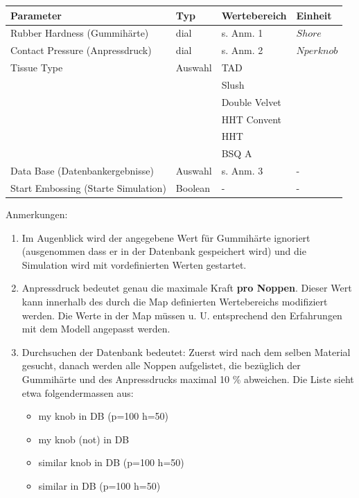 \vspace{0.5cm}
\begin{tabular}{|l|l|l|l|} \hline
Parameter 		& Typ 		& Wertebereich 	& Einheit	         \\ \hline
Rubber Hardness (Gummih\"arte) 	& dial		& s. Anm. 1 	& \symbol{23} $Shore$ \\ \hline
Contact Pressure (Anpressdruck)	& dial		& s. Anm. 2 	& $N per knob$ 	 \\ \hline
Tissue Type      	& Auswahl 	& TAD		&		 \\ 
			& 		& Slush 	&		 \\
			& 		& Double Velvet &		 \\				
			& 		& HHT Convent	& 		 \\ 
			&		& HHT      	& 		 \\ 
			& 		& BSQ A 	& 		 \\ \hline
Data Base (Datenbankergebnisse)		& Auswahl	& s. Anm. 3	& - 		 \\ \hline
Start Embossing (Starte Simulation)    	& Boolean   	& -             & -              \\ \hline
\end{tabular}
\vspace{0.5cm}


Anmerkungen: 
\begin{enumerate}

\item Im Augenblick wird der angegebene Wert f\"ur Gummih\"arte ignoriert (ausgenommen dass er
in der Datenbank gespeichert wird) und die Simulation wird mit vordefinierten Werten
gestartet.

\item Anpressdruck bedeutet genau die maximale Kraft {\bf pro Noppen}. Dieser Wert kann
innerhalb des durch die Map definierten Wertebereichs modifiziert werden. Die Werte in der
Map m\"ussen u. U. entsprechend den Erfahrungen mit dem Modell angepasst werden.
  
\item Durchsuchen der Datenbank bedeutet: Zuerst wird nach dem selben Material gesucht,
danach werden alle Noppen aufgelistet, die bez\"uglich der Gummih\"arte und des Anpressdrucks
maximal 10 \% abweichen.\newline 
Die Liste sieht etwa folgendermassen aus:
	\begin{itemize}
	\item my knob in DB (p=100 h=50)
	\item my knob (not) in DB
	\item similar knob in DB (p=100 h=50)
	\item similar in DB (p=100 h=50)
	\end{itemize}
\end{enumerate}

